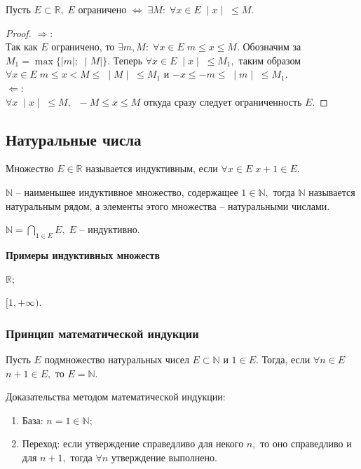 \begin{Proposition}
Пусть $E\subset\mathbb{R}, \; E$ ограничено $\Leftrightarrow \; \exists M: \; \forall x\in E \; \mid x\mid\;\leq M.$
\end{Proposition}
\begin{proof}
$\Rightarrow:$\\
Так как $E$ ограничено, то $\exists m, M: \; \forall x\in E \; m\leq x\leq M.$ Обозначим за $M_1=\max\{\mid m\mid;\;\mid M\mid\}.$ Теперь $\forall x\in E \; \mid x\mid\;\leq M_1,$ таким образом $\forall x\in E \; m\leq x<M\leq\;\mid M\mid\;\leq M_1$ и $-x\leq-m\leq\;\mid m\mid\;\leq M_1.$ \\
$\Leftarrow:$\\
$\forall x \; \mid x\mid\;\leq M, \;\; -M\leq x\leq M$ откуда сразу следует ограниченность $E.$
\end{proof}
\subsection{Натуральные числа}
\begin{Definition}
Множество $E\in\mathbb{R}$ называется индуктивным, если $\forall x\in E \; x+1\in E.$

$\mathbb{N}$ -- наименьшее индуктивное множество, содержащее $1\in\mathbb{N},$ тогда $\mathbb{N}$ называется натуральным рядом, а элементы этого множества -- натуральными числами.

$\mathbb{N}=\bigcap\limits_{1\in E}E, \; E$ -- индуктивно. 
\end{Definition}

\par\medskip \textbf{Примеры индуктивных множеств}\par
$\mathbb{R};$

$[1, +\infty).$

\subsubsection{Принцип математической индукции}
Пусть $E$ подмножество натуральных чисел $E\subset\mathbb{N}$ и $1\in E.$ Тогда, если $\forall n\in E$\\ $n+1\in E,$ то $E=\mathbb{N}.$

Доказательства методом математической индукции:
\begin{enumerate}
\item База: $n=1\in\mathbb{N};$
\item Переход: если утверждение справедливо для некого $n,$ то оно справедливо и для $n+1,$ тогда $\forall n$ утверждение выполнено.
\end{enumerate}


